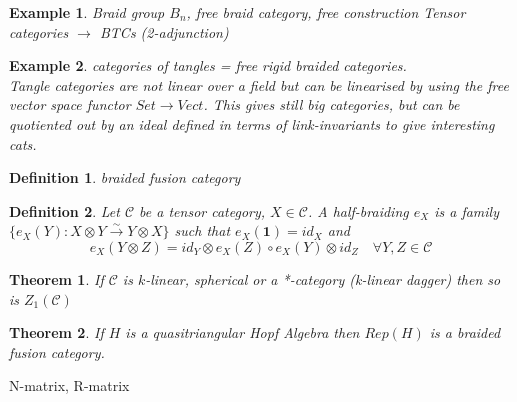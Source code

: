 \documentclass{article}
\newtheorem{definition}{Definition}
\newtheorem{example}{Example}
\newtheorem{theorem}{Theorem}
\begin{document}
\begin{example}
	Braid group $B_n$, free braid category, free construction Tensor categories $\rightarrow$ BTCs (2-adjunction)
\end{example}
\begin{example}
	categories of tangles = free rigid braided categories.\\
	Tangle categories are not linear over a field but can be linearised by using the free vector space functor $Set \rightarrow Vect$. This gives still big categories, but can be quotiented out by an ideal defined in terms of link-invariants to give interesting cats.
\end{example}
\begin{definition}
	braided fusion category
\end{definition}
\begin{definition}
	Let $\mathcal{C}$ be a tensor category, $X \in \mathcal{C}$. A half-braiding $e_X$ is a family $\{ e_X(Y):X\otimes Y \xrightarrow{\sim} Y\otimes X \}$ such that $e_X(\mathbf{1}) = id_X$ and 
	\begin{equation*}
	e_X(Y\otimes Z) = id_Y\otimes e_X(Z) \circ e_X(Y) \otimes id_Z \quad \forall Y,Z \in \mathcal{C}
	\end{equation*}
\end{definition}

\begin{theorem}
	If $\mathcal{C}$ is $k$-linear, spherical or a *-category (k-linear dagger) then so is $Z_1(\mathcal{C})$ 
\end{theorem}
\begin{theorem}
	If $H$ is a quasitriangular Hopf Algebra then $Rep(H)$ is a braided fusion category.
\end{theorem}

N-matrix, R-matrix
\end{document}

